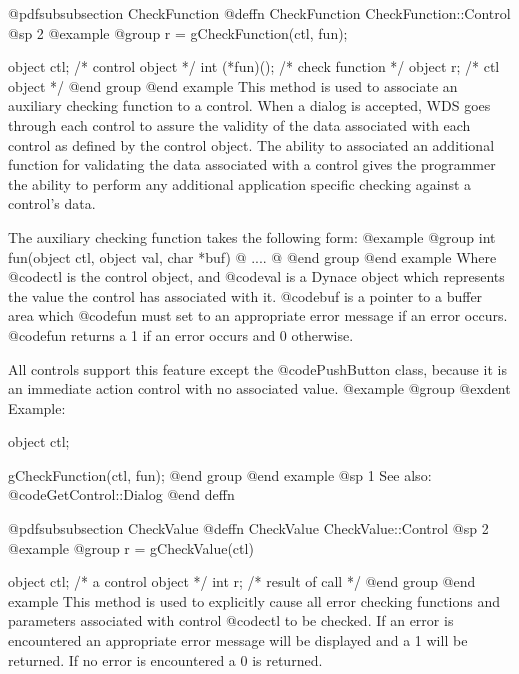 @pdfsubsubsection {CheckFunction}
@deffn {CheckFunction} CheckFunction::Control
@sp 2
@example
@group
r = gCheckFunction(ctl, fun);

object  ctl;      /*  control object  */
int     (*fun)(); /*  check function  */
object  r;        /*  ctl object      */
@end group
@end example
This method is used to associate an auxiliary checking function to a control.
When a dialog is accepted, WDS goes through each control to assure the
validity of the data associated with each control as defined by the control
object.  The ability to associated an additional function for validating
the data associated with a control gives the programmer the ability to perform
any additional application specific checking against a control's data.

The auxiliary checking function takes the following form:
@example
@group
int     fun(object ctl, object val, char *buf)
@{
        ....
@}
@end group
@end example
Where @code{ctl} is the control object, and @code{val} is a Dynace object which
represents the value the control has associated with it.  @code{buf} is a
pointer to a buffer area which @code{fun} must set to an appropriate error
message if an error occurs.  @code{fun} returns a 1 if an error occurs and
0 otherwise.

All controls support this feature except the @code{PushButton} class,
because it is an immediate action control with no associated value.
@example
@group
@exdent Example:

object  ctl;

gCheckFunction(ctl, fun);
@end group
@end example
@sp 1
See also:  @code{GetControl::Dialog}
@end deffn















@pdfsubsubsection {CheckValue}
@deffn {CheckValue} CheckValue::Control
@sp 2
@example
@group
r = gCheckValue(ctl)

object   ctl;   /*  a control object  */
int      r;     /*  result of call    */
@end group
@end example
This method is used to explicitly cause all error checking functions and
parameters associated with control @code{ctl} to be checked.  If an error
is encountered an appropriate error message will be displayed and a 1
will be returned.  If no error is encountered a 0 is returned.

